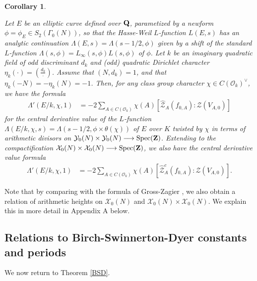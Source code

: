 \documentclass{amsart}
\newtheorem{corollary}[theorem]{Corollary}
\theoremstyle{definition}
\theoremstyle{definition}
\theoremstyle{definition}
\begin{document}
\begin{corollary}\label{ec}

Let $E$ be an elliptic curve defined over ${\bf{Q}}$, parametized by a newform 
$\phi = \phi_E \in S_2(\Gamma_0(N))$, so that the Hasse-Weil $L$-function $L(E,s)$ has an analytic continuation 
$\Lambda(E, s) = \Lambda(s-1/2, \phi)$ given by a shift of the standard $L$-function $\Lambda(s, \phi) = L_{\infty}(s, \phi)L(s, \phi)$ of $\phi$.
Let $k$ be an imaginary quadratic field of odd discriminant $d_k$ and (odd) quadratic Dirichlet character $\eta_k(\cdot) = (\frac{d_k}{\cdot})$.
Assume that $(N, d_k)=1$, and that $\eta_k(-N) = - \eta_k(N) = -1$. 
Then, for any class group character $\chi \in C(\mathcal{O}_k)^{\vee}$, we have the formula 
\begin{align*} \Lambda'(E/k, \chi, 1) &= - 2 \sum\limits_{A \in C(\mathcal{O}_k)} \chi(A) 
\left[ \widehat{\mathcal{Z}}_A(f_{0, A}): \mathcal{Z}(V_{A,0})\right] \end{align*}
for the central derivative value of the $L$-function $\Lambda(E/k, \chi, s) = \Lambda(s-1/2, \phi \times \theta(\chi))$ of $E$ over $K$ twisted by $\chi$
in terms of arithmetic divisors on $\mathcal{Y}_0(N) \times \mathcal{Y}_0(N) \longrightarrow \operatorname{Spec}({\bf{Z}})$.
Extending to the compactification $\mathcal{X}_0(N) \times \mathcal{X}_0(N) \longrightarrow \operatorname{Spec}({\bf{Z}})$, we also have the central derivative value formula
\begin{align*} \Lambda'(E/k, \chi, 1) &= - 2 \sum\limits_{A \in C(\mathcal{O}_k)} \chi(A) 
\left[ \widehat{\mathcal{Z}}_A^c(f_{0, A}): \mathcal{Z}(V_{A,0})\right]. \end{align*} \end{corollary}

Note that by comparing with the formula of Gross-Zagier \cite[Theorem I (6.3)]{GZ}, we also obtain a relation of 
arithmetic heights on $\mathcal{X}_0(N)$ and $\mathcal{X}_0(N) \times \mathcal{X}_0(N)$. We explain this in more detail in Appendix A below. 

\subsection{Relations to Birch-Swinnerton-Dyer constants and periods}

We now return to Theorem \ref{BSD}.
\end{document}
